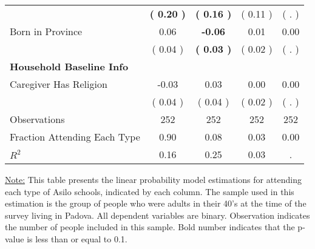 \begin{table}[H]
{\begin{tabular}{lcccc}
\quad  & \textbf{(     0.20 )} & \textbf{(     0.16 )}  & (     0.11 )  & (        . )  \\
\quad Born in Province &      0.06 & \textbf{    -0.06} &      0.01 &      0.00 \\
\quad  & (     0.04 ) & \textbf{(     0.03 )}  & (     0.02 )  & (        . )  \\
\midrule
\textbf{Household Baseline Info} \\
\quad Caregiver Has Religion &     -0.03 &      0.03 &      0.00 &      0.00 \\
\quad  & (     0.04 ) & (     0.04 )  & (     0.02 )  & (        . )  \\
\midrule
Observations & 252 & 252 & 252 & 252 \\
Fraction Attending Each Type &      0.90 &      0.08 &      0.03 &      0.00 \\
\midrule
$ R^2$ &      0.16 &      0.25 &      0.03 &         . \\
\bottomrule
\end{tabular}}
\end{table}
\begin{footnotesize}
\noindent\underline{Note:} This table presents the linear probability model estimations for attending each type of Asilo schools, indicated by each column. The sample used in this estimation is the group of people who were adults in their 40's at the time of the survey living in Padova. All dependent variables are binary. Observation indicates the number of people included in this sample. Bold number indicates that the p-value is less than or equal to 0.1.
\end{footnotesize}
